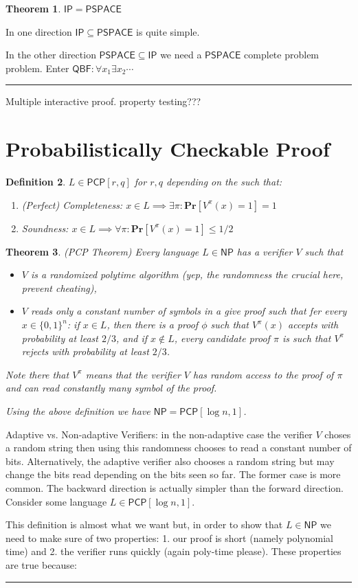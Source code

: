 \documentclass[twoside]{article}
\newcounter{lecnum}
\newtheorem{theorem}{Theorem}[lecnum]
\newtheorem{definition}[theorem]{Definition}
\newenvironment{proof}{{\bf Proof:}}{\hfill\rule{2mm}{2mm}}
\def\Pr{\mathbf{Pr}}
\def\NP{\mathsf{NP}}
\def\IP{\mathsf{IP}}
\def\PSPACE{\mathsf{PSPACE}}
\def\QBF{\mathsf{QBF}}
\def\PCP{\mathsf{PCP}}
\begin{document}
\begin{theorem}
$\IP = \PSPACE$
\end{theorem}
\begin{proof}
In one direction $\IP \subseteq \PSPACE$ is quite simple. 

In the other direction $\PSPACE \subseteq \IP$ we need a $\PSPACE$ complete problem problem. Enter $\QBF: \forall x_1 \exists x_2 \cdots$ 
\end{proof}

Multiple interactive proof. 
property testing???

\section{Probabilistically Checkable Proof}
\begin{definition}
$L \in \PCP[r, q]$ for $r, q$ depending on the such that:
\begin{enumerate}
\item (Perfect) Completeness: $x \in L \implies \exists \pi: \Pr[V^{\pi}(x) = 1 ] = 1$ 
\item Soundness: $x \in L \implies \forall \pi: \Pr[V^{\pi}(x) = 1] \leq 1/2$ 
\end{enumerate}
\end{definition}

\begin{theorem}
(PCP Theorem) Every language $L \in \NP$ has a verifier $V$ such that 
\begin{itemize}
\item $V$ is a randomized polytime algorithm (yep, the randomness the crucial here, prevent cheating),
\item $V$ reads only a constant number of symbols in a give proof such that fer every $x \in \{0,1\}^n$: if $x \in L$, then there is a proof $\phi$ such that $V^{\pi}(x)$ accepts with probability at least $2/3$, and if $x \notin L$, every candidate proof $\pi$ is such that $V^{\pi}$ rejects with probability at least $2/3$.
\end{itemize}
Note there that $V^{\pi}$ means that the verifier $V$ has random access to the proof of $\pi$ and can read constantly many symbol of the proof.

Using the above definition we have $\NP = \PCP [\log n, 1]$. 
\end{theorem}
Adaptive vs. Non-adaptive Verifiers: in the non-adaptive case the verifier $V$ choses a random string then using this randomness chooses to read a constant number of bits. Alternatively, the adaptive verifier also chooses a random string but may change the bits read depending on the bits seen so far. The former case is more common.  
\begin{proof}
The backward direction is actually simpler than the forward direction. Consider some language $L \in \PCP[ \log n, 1]$. 

This definition is almost what we want but, in order to show that $L \in \NP$ we need to make sure of two properties: 1. our proof is short (namely polynomial time) and 2. the verifier runs quickly (again poly-time please). These properties are true because: 	
\end{proof}
\end{document}
